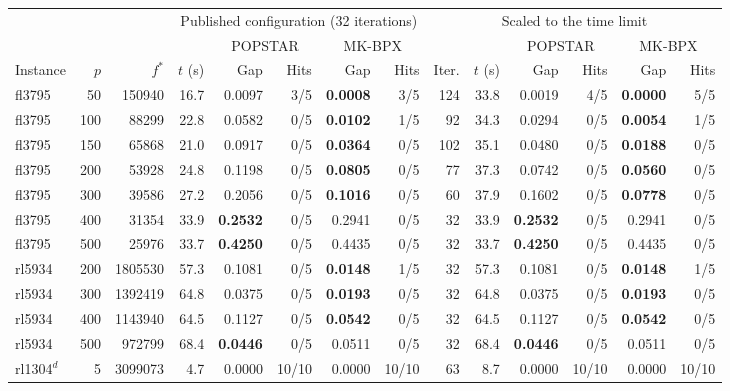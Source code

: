 \begin{tabular}{lrr@{\hskip 10pt}rrrrr@{\hskip 10pt}rrrrrr}
\toprule
 & & & \multicolumn{5}{c}{Published configuration (32 iterations)} & \multicolumn{6}{c}{Scaled to the time limit} \\
\cmidrule(lr){4-8}\cmidrule(lr){9-14}
 & & & & \multicolumn{2}{c}{POPSTAR} & \multicolumn{2}{c}{MK-BPX} & & & \multicolumn{2}{c}{POPSTAR} & \multicolumn{2}{c}{MK-BPX} \\
\cmidrule(lr){5-6}\cmidrule(lr){7-8}\cmidrule(lr){11-12}\cmidrule(lr){13-14}
Instance & $p$ & $f^*$ & $t$ (s) & Gap & Hits & Gap & Hits & Iter. & $t$ (s) & Gap & Hits & Gap & Hits \\
\midrule
fl3795 & 50 & 150940 & 16.7 & 0.0097 & 3/5 & \textbf{0.0008} & 3/5 & 124 & 33.8 & 0.0019 & 4/5 & \textbf{0.0000} & 5/5 \\
fl3795 & 100 & 88299 & 22.8 & 0.0582 & 0/5 & \textbf{0.0102} & 1/5 & 92 & 34.3 & 0.0294 & 0/5 & \textbf{0.0054} & 1/5 \\
fl3795 & 150 & 65868 & 21.0 & 0.0917 & 0/5 & \textbf{0.0364} & 0/5 & 102 & 35.1 & 0.0480 & 0/5 & \textbf{0.0188} & 0/5 \\
fl3795 & 200 & 53928 & 24.8 & 0.1198 & 0/5 & \textbf{0.0805} & 0/5 & 77 & 37.3 & 0.0742 & 0/5 & \textbf{0.0560} & 0/5 \\
fl3795 & 300 & 39586 & 27.2 & 0.2056 & 0/5 & \textbf{0.1016} & 0/5 & 60 & 37.9 & 0.1602 & 0/5 & \textbf{0.0778} & 0/5 \\
fl3795 & 400 & 31354 & 33.9 & \textbf{0.2532} & 0/5 & 0.2941 & 0/5 & 32 & 33.9 & \textbf{0.2532} & 0/5 & 0.2941 & 0/5 \\
fl3795 & 500 & 25976 & 33.7 & \textbf{0.4250} & 0/5 & 0.4435 & 0/5 & 32 & 33.7 & \textbf{0.4250} & 0/5 & 0.4435 & 0/5 \\
\addlinespace[2pt]
rl5934 & 200 & 1805530 & 57.3 & 0.1081 & 0/5 & \textbf{0.0148} & 1/5 & 32 & 57.3 & 0.1081 & 0/5 & \textbf{0.0148} & 1/5 \\
rl5934 & 300 & 1392419 & 64.8 & 0.0375 & 0/5 & \textbf{0.0193} & 0/5 & 32 & 64.8 & 0.0375 & 0/5 & \textbf{0.0193} & 0/5 \\
rl5934 & 400 & 1143940 & 64.5 & 0.1127 & 0/5 & \textbf{0.0542} & 0/5 & 32 & 64.5 & 0.1127 & 0/5 & \textbf{0.0542} & 0/5 \\
rl5934 & 500 & 972799 & 68.4 & \textbf{0.0446} & 0/5 & 0.0511 & 0/5 & 32 & 68.4 & \textbf{0.0446} & 0/5 & 0.0511 & 0/5 \\
\addlinespace[2pt]
rl1304$^{d}$ & 5 & 3099073 & 4.7 & 0.0000 & 10/10 & 0.0000 & 10/10 & 63 & 8.7 & 0.0000 & 10/10 & 0.0000 & 10/10 \\

\end{tabular}

